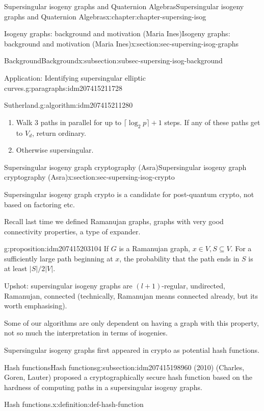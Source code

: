 \documentclass[oneside,10pt,]{book}
\numberwithin{equation}{section}
\begin{document}
\begin{chapterptx}{Supersingular isogeny graphs and Quaternion Algebras}{}{Supersingular isogeny graphs and Quaternion Algebras}{}{}{x:chapter:chapter-supersing-isog}
\begin{sectionptx}{Isogeny graphs: background and motivation (Maria Ines)}{}{Isogeny graphs: background and motivation (Maria Ines)}{}{}{x:section:sec-supersing-isog-graphs}
\begin{subsectionptx}{Background}{}{Background}{}{}{x:subsection:subsec-supersing-isog-background}
\begin{paragraphs}{Application: Identifying supersingular elliptic curves.}{g:paragraphs:idm207415211728}
\begin{algorithm}{Sutherland.}{}{g:algorithm:idm207415211280}
\begin{enumerate}
\item{}Walk 3 paths in parallel for up to \(\lceil \log_2 p \rceil + 1 \) steps. If any of these paths get to \(V_d\), return ordinary.%
\item{}Otherwise supersingular.%
\end{enumerate}
%
\end{algorithm}
\end{paragraphs}%
\end{subsectionptx}
\end{sectionptx}
%
%
\typeout{************************************************}
\typeout{************************************************}
%
\begin{sectionptx}{Supersingular isogeny graph cryptography (Asra)}{}{Supersingular isogeny graph cryptography (Asra)}{}{}{x:section:sec-supersing-isog-crypto}
\begin{introduction}{}%
Supersingular isogeny graph crypto is a candidate for post-quantum crypto, not based on factoring etc.%
\par
Recall last time we defined Ramanujan graphs, graphs with very good connectivity properties, a type of expander.%
\begin{proposition}{}{}{g:proposition:idm207415203104}%
If \(G\) is a Ramanujan graph, \(x\in V, S\subseteq V\). For a sufficiently large path beginning at \(x\), the probability that the path ends in \(S\) is at least \(|S|/2|V|\).%
\end{proposition}
Upshot: supersingular isogeny graphs are \((l +1)\)-regular, undirected, Ramanujan, connected (technically, Ramanujan means connected already, but its worth emphasising).%
\par
Some of our algorithms are only dependent on having a graph with this property, not so much the interpretation in terms of isogenies.%
\par
Supersingular isogeny graphs first appeared in crypto as potential hash functions.%
\end{introduction}%
%
%
\typeout{************************************************}
\typeout{************************************************}
%
\begin{subsectionptx}{Hash functions}{}{Hash functions}{}{}{g:subsection:idm207415198960}
(2010) (Charles, Goren, Lauter) proposed a cryptographically secure hash function based on the hardness of computing paths in a supersingular isogeny graphs.%
\begin{definition}{Hash functions.}{x:definition:def-hash-function}%

\end{definition}
\end{subsectionptx}
\end{sectionptx}
\end{chapterptx}
\end{document}
